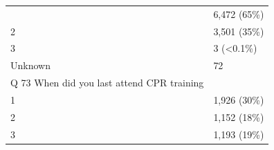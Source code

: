 \documentclass[]{article}
\begin{document}
\begin{longtable}[]{@{}ll@{}}
\begin{minipage}[t]{0.71\columnwidth}
\end{minipage} & \begin{minipage}[t]{0.23\columnwidth}\raggedright
6,472 (65\%)\strut
\end{minipage}\tabularnewline
\begin{minipage}[t]{0.71\columnwidth}\raggedright
2\strut
\end{minipage} & \begin{minipage}[t]{0.23\columnwidth}\raggedright
3,501 (35\%)\strut
\end{minipage}\tabularnewline
\begin{minipage}[t]{0.71\columnwidth}\raggedright
3\strut
\end{minipage} & \begin{minipage}[t]{0.23\columnwidth}\raggedright
3 (\textless{}0.1\%)\strut
\end{minipage}\tabularnewline
\begin{minipage}[t]{0.71\columnwidth}\raggedright
Unknown\strut
\end{minipage} & \begin{minipage}[t]{0.23\columnwidth}\raggedright
72\strut
\end{minipage}\tabularnewline
\begin{minipage}[t]{0.71\columnwidth}\raggedright
Q 73 When did you last attend CPR training\strut
\end{minipage} & \begin{minipage}[t]{0.23\columnwidth}\raggedright
\strut
\end{minipage}\tabularnewline
\begin{minipage}[t]{0.71\columnwidth}\raggedright
1\strut
\end{minipage} & \begin{minipage}[t]{0.23\columnwidth}\raggedright
1,926 (30\%)\strut
\end{minipage}\tabularnewline
\begin{minipage}[t]{0.71\columnwidth}\raggedright
2\strut
\end{minipage} & \begin{minipage}[t]{0.23\columnwidth}\raggedright
1,152 (18\%)\strut
\end{minipage}\tabularnewline
\begin{minipage}[t]{0.71\columnwidth}\raggedright
3\strut
\end{minipage} & \begin{minipage}[t]{0.23\columnwidth}\raggedright
1,193 (19\%)\strut
\end{minipage}\tabularnewline

\end{longtable}
\end{document}

